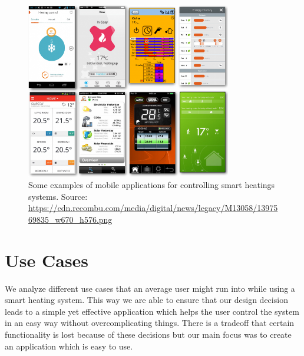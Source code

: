 \begin{figure}
	\begin{center}
		\includegraphics[width=0.8\textwidth]{images/smart_heating_apps.png}
	\end{center}
	\caption{Some examples of mobile applications for controlling smart heatings systems. Source: \url{https://cdn.recombu.com/media/digital/news/legacy/M13058/1397569835_w670_h576.png}}
	\label{fig:smart_heating_apps}
\end{figure}


\section{Use Cases}
\label{sec:use_cases}

We analyze different use cases that an average user might run into while using a smart heating system. This way we are able to ensure that our design decision leads to a simple yet effective application which helps the user control the system in an easy way without overcomplicating things. There is a tradeoff that certain functionality is lost because of these decisions but our main focus was to create an application which is easy to use. 

